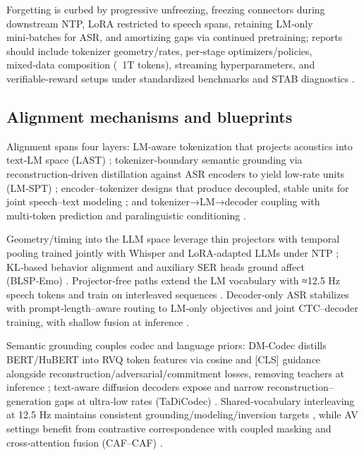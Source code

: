 \documentclass{article}
\begin{document}
Forgetting is curbed by progressive unfreezing, freezing connectors during downstream NTP, LoRA restricted to speech spans, retaining LM‑only mini‑batches for ASR, and amortizing gaps via continued pretraining; reports should include tokenizer geometry/rates, per‑stage optimizers/policies, mixed‑data composition (~1T tokens), streaming hyperparameters, and verifiable‑reward setups under standardized benchmarks and STAB diagnostics \cite{nguyen2025qwenvsgemmaintegrationwhispercomparative,hsu2024exploringcontextlearningtextlessspeechla,zeng2024scalingspeechtextpretrainingsyntheticint,vashishth2024stabspeechtokenizerassessmentbenchmark,entry2025indicsuperbspeechprocessinguniversalperf,sadok2025vectorquantizedmaskedautoencoderaudiovis,wang2025tadicodectextawarediffusionspeechtokeniz}.

\subsection{Alignment mechanisms and blueprints} \label{subsec:Alignment mechanisms and blueprints}
Alignment spans four layers: LM‑aware tokenization that projects acoustics into text‑LM space (LAST) \cite{turetzky2024lastlanguagemodelawarespeechtokenization}; tokenizer‑boundary semantic grounding via reconstruction‑driven distillation against ASR encoders to yield low‑rate units (LM‑SPT) \cite{jo2025lmsptalignedsemanticdistillationspeechto}; encoder–tokenizer designs that produce decoupled, stable units for joint speech–text modeling \cite{entry2025towardjointlanguagemodelingspeechunitste}; and tokenizer→LM→decoder coupling with multi‑token prediction and paralinguistic conditioning \cite{fan2025whatmakesgoodspeechtokenizerllmcentricge,wang2025incorporatingcontextualparalinguisticund}.

Geometry/timing into the LLM space leverage thin projectors with temporal pooling trained jointly with Whisper and LoRA‑adapted LLMs under NTP \cite{nguyen2025qwenvsgemmaintegrationwhispercomparative}; KL‑based behavior alignment and auxiliary SER heads ground affect (BLSP‑Emo) \cite{wang2024blspemotowardsempatheticlargespeechlangu}. Projector‑free paths extend the LM vocabulary with ≈12.5 Hz speech tokens and train on interleaved sequences \cite{zeng2024scalingspeechtextpretrainingsyntheticint}. Decoder‑only ASR stabilizes with prompt‑length–aware routing to LM‑only objectives and joint CTC–decoder training, with shallow fusion at inference \cite{tsunoo2024decoderonlyarchitecturespeechrecognition}.

Semantic grounding couples codec and language priors: DM‑Codec distills BERT/HuBERT into RVQ token features via cosine and [CLS] guidance alongside reconstruction/adversarial/commitment losses, removing teachers at inference \cite{ahasan2025dmcodecdistillingmultimodalrepresentatio}; text‑aware diffusion decoders expose and narrow reconstruction–generation gaps at ultra‑low rates (TaDiCodec) \cite{wang2025tadicodectextawarediffusionspeechtokeniz}. Shared‑vocabulary interleaving at 12.5 Hz maintains consistent grounding/modeling/inversion targets \cite{zeng2024scalingspeechtextpretrainingsyntheticint}, while AV settings benefit from contrastive correspondence with coupled masking and cross‑attention fusion (CAF–CAF) \cite{sadok2025vectorquantizedmaskedautoencoderaudiovis}.
\end{document}
